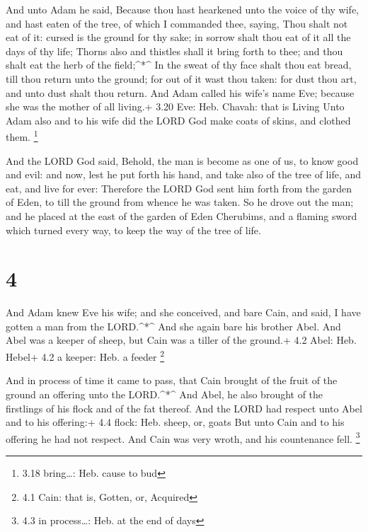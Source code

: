  And unto Adam he said, Because thou hast hearkened unto
the voice of thy wife, and hast eaten of the tree, of which I commanded
thee, saying, Thou shalt not eat of it: cursed is the ground for thy
sake; in sorrow shalt thou eat of it all the days of thy life;
 Thorns also and thistles shall it bring forth to thee; and
thou shalt eat the herb of the field;\^{}*\^{}  In the
sweat of thy face shalt thou eat bread, till thou return unto the
ground; for out of it wast thou taken: for dust thou art, and unto dust
shalt thou return.  And Adam called his wife's name Eve;
because she was the mother of all living.+ 3.20 Eve: Heb. Chavah: that
is Living  Unto Adam also and to his wife did the LORD God
make coats of skins, and clothed them. \footnote{3.18 bring\ldots: Heb.
  cause to bud}

 And the LORD God said, Behold, the man is become as one of
us, to know good and evil: and now, lest he put forth his hand, and take
also of the tree of life, and eat, and live for ever: 
Therefore the LORD God sent him forth from the garden of Eden, to till
the ground from whence he was taken.  So he drove out the
man; and he placed at the east of the garden of Eden Cherubims, and a
flaming sword which turned every way, to keep the way of the tree of
life.

\hypertarget{section-3}{%
\section{4}\label{section-3}}

 And Adam knew Eve his wife; and she conceived, and bare
Cain, and said, I have gotten a man from the LORD.\^{}*\^{} 
And she again bare his brother Abel. And Abel was a keeper of sheep, but
Cain was a tiller of the ground.+ 4.2 Abel: Heb. Hebel+ 4.2 a keeper:
Heb. a feeder \footnote{4.1 Cain: that is, Gotten, or, Acquired}

 And in process of time it came to pass, that Cain brought
of the fruit of the ground an offering unto the LORD.\^{}*\^{}
 And Abel, he also brought of the firstlings of his flock
and of the fat thereof. And the LORD had respect unto Abel and to his
offering:+ 4.4 flock: Heb. sheep, or, goats  But unto Cain
and to his offering he had not respect. And Cain was very wroth, and his
countenance fell. \footnote{4.3 in process\ldots: Heb. at the end of
  days}

